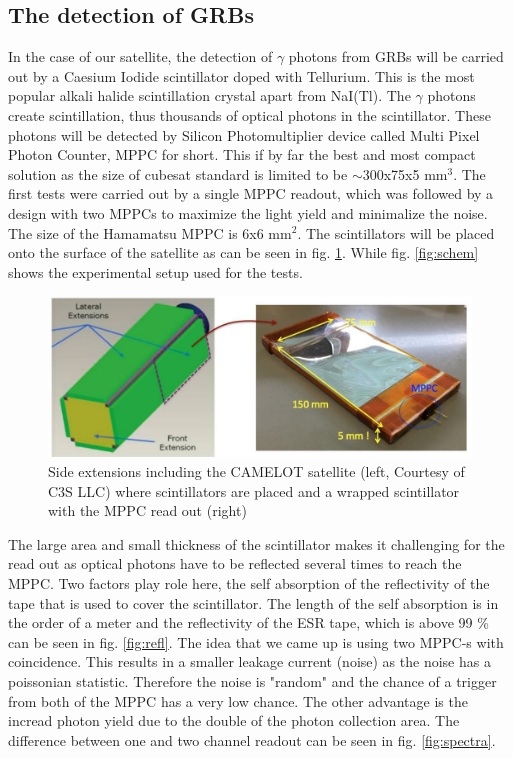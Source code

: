 \documentclass[12pt, a4paper,titlepage]{article}
\numberwithin{equation}{section}
\numberwithin{figure}{section}
\begin{document}
\subsection{The detection of GRBs}

In the case of our satellite, the detection of $\gamma$ photons from GRBs will be carried out by a Caesium Iodide scintillator doped with Tellurium. This is the most popular alkali halide scintillation crystal apart from NaI(Tl). The $\gamma$ photons create scintillation, thus thousands of optical photons in the scintillator. These photons will be detected by Silicon Photomultiplier device called Multi Pixel Photon Counter, MPPC for short. This if by far the best and most compact solution as the size of cubesat standard is limited to be $\sim$300x75x5 mm$^{3}$. The first tests were carried out by a single MPPC readout, which was followed by a design with two MPPCs to maximize the light yield and minimalize the noise. The size of the Hamamatsu MPPC is 6x6 mm$^{2}$. The scintillators will be placed onto the surface of the satellite as can be seen in fig. \ref{fig:scints}. While fig. \ref{fig:schem} shows the experimental setup used for the tests.

\begin{figure}[H]
\centering
\includegraphics[width=130.0mm]{images/scint_on_sate.png}
\caption{Side extensions including the CAMELOT satellite (left, Courtesy of C3S LLC) where scintillators are placed and a wrapped scintillator with the MPPC read out (right) \cite{kento}}
\label{fig:scints}
\end{figure}

The large area and small thickness of the scintillator makes it challenging for the read out as optical photons have to be reflected several times to reach the MPPC. Two factors play role here, the self absorption of the reflectivity of the tape that is used to cover the scintillator. The length of the self absorption is in the order of a meter and the reflectivity of the ESR tape, which is above 99 \% can be seen in fig. \ref{fig:refl}. The idea that we came up is using two MPPC-s with coincidence. This results in a smaller leakage current (noise) as the noise has a poissonian statistic. Therefore the noise is "random" and the chance of a trigger from both of the MPPC has a very low chance. The other advantage is the incread photon yield due to the double of the photon collection area. The difference between one and two channel readout can be seen in fig. \ref{fig:spectra}.
\end{document}
